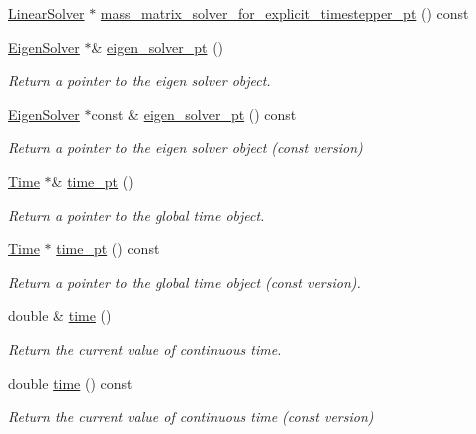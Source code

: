 \begin{DoxyCompactItemize}
\item 
\hyperlink{classoomph_1_1LinearSolver}{Linear\+Solver} $\ast$ \hyperlink{classoomph_1_1Problem_a10ffcfbf305940a05452d950df7a11c3}{mass\+\_\+matrix\+\_\+solver\+\_\+for\+\_\+explicit\+\_\+timestepper\+\_\+pt} () const
\item 
\hyperlink{classoomph_1_1EigenSolver}{Eigen\+Solver} $\ast$\& \hyperlink{classoomph_1_1Problem_abd8a7002c37f3a96d0af213bfea8e23c}{eigen\+\_\+solver\+\_\+pt} ()
\begin{DoxyCompactList}\small\item\em Return a pointer to the eigen solver object. \end{DoxyCompactList}\item 
\hyperlink{classoomph_1_1EigenSolver}{Eigen\+Solver} $\ast$const  \& \hyperlink{classoomph_1_1Problem_a14d44adcbf581d43154be19d127b6183}{eigen\+\_\+solver\+\_\+pt} () const
\begin{DoxyCompactList}\small\item\em Return a pointer to the eigen solver object (const version) \end{DoxyCompactList}\item 
\hyperlink{classoomph_1_1Time}{Time} $\ast$\& \hyperlink{classoomph_1_1Problem_a425403e4cb6678015b20f2dddc7a2f89}{time\+\_\+pt} ()
\begin{DoxyCompactList}\small\item\em Return a pointer to the global time object. \end{DoxyCompactList}\item 
\hyperlink{classoomph_1_1Time}{Time} $\ast$ \hyperlink{classoomph_1_1Problem_aa86b09eac493cfa9fcbe57734985ba19}{time\+\_\+pt} () const
\begin{DoxyCompactList}\small\item\em Return a pointer to the global time object (const version). \end{DoxyCompactList}\item 
double \& \hyperlink{classoomph_1_1Problem_acd8c357349d20a28af70b2b7ea7f488d}{time} ()
\begin{DoxyCompactList}\small\item\em Return the current value of continuous time. \end{DoxyCompactList}\item 
double \hyperlink{classoomph_1_1Problem_a925acb2e840deb4edc6305da8fced0e3}{time} () const
\begin{DoxyCompactList}\small\item\em Return the current value of continuous time (const version) \end{DoxyCompactList}\item 

\end{DoxyCompactItemize}
